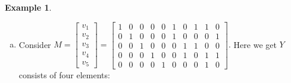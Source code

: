 \documentclass[12pt]{article}
\theoremstyle{definition}
\newtheorem{exmp}{Example}
\begin{document}
\begin{exmp}
\begin{enumerate}[a)]
                 Then $C(y_1)\cap C(y_2)=\langle v_2+v_3, v_2+v_5, v_1+v_2+v_4\rangle $ is generated by
                                                      $$\left[\begin{matrix}
                   0 & 1 & 1 & 0 & 0 & 1 & 1 & 1 & 0 & 0 \\
                   0& 1  & 0 & 0 & 1 & 1 & 0 & 0 & 1 & 1 \\
                   1 & 1 & 0 & 1 & 0 & 0 & 1 & 1 & 0& 1
                 \end{matrix}\right]$$  and the matrix
                 $$\left[\begin{matrix}
                   0 & 1 & 1 & 0 & 0 & 1 & 1 & 1 & 0 & 0 \\
                   0& 1  & 0 & 0 & 1 & 1 & 0 & 0 & 1 & 1 \\
                   1 & 1 & 0 & 1 & 0 & 0 & 1 & 1 & 0& 1\\
                   0 & 0 & 0& 1 & 0 & 0 & 0 & 1 & 1 & 0
                 \end{matrix}\right]$$
                  generates a projective code $X=[10, 4]_2$ which contains $(k-1)$-dimensional subspace $C(y_1)\cap C(y_2)$ and is not contained in $U$. Consequently,
                   $\langle U]^{\Pi}_{k}\subset[C(y_1)\cap C(y_2)\rangle^{\Pi}_{k}$ and is not a maximal clique.
    \item Consider $M=\left[\begin{matrix}
                                                        v_1 \\
                                                        v_2 \\
                                                        v_3 \\
                                                        v_4 \\
                                                        v_5
                                                      \end{matrix}\right]=\left[\begin{matrix}
                   1 & 0 & 0 & 0 & 0 & 1 & 0 & 1 & 1 & 0 \\
                   0& 1  & 0 & 0 & 0 & 1 & 0 & 0 & 0 & 1 \\
                   0 & 0 & 1 & 0 & 0 & 0 & 1 & 1 & 0& 0\\
                   0 & 0 & 0 & 1 & 0 & 0 & 1 & 0 & 1 & 1 \\
                   0 & 0 & 0 & 0 & 1 & 0 & 0 & 0 & 1 & 0
                 \end{matrix}\right].$ Here we get $Y$ consists of four elements:

\end{enumerate}
\end{exmp}
\end{document}
